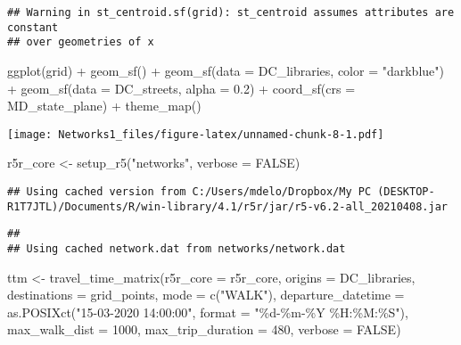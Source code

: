\documentclass[
]{article}
\newenvironment{Shaded}{\begin{snugshade}}{\end{snugshade}}
\newcommand{\AttributeTok}[1]{\textcolor[rgb]{0.77,0.63,0.00}{#1}}
\newcommand{\ConstantTok}[1]{\textcolor[rgb]{0.00,0.00,0.00}{#1}}
\newcommand{\DecValTok}[1]{\textcolor[rgb]{0.00,0.00,0.81}{#1}}
\newcommand{\FloatTok}[1]{\textcolor[rgb]{0.00,0.00,0.81}{#1}}
\newcommand{\FunctionTok}[1]{\textcolor[rgb]{0.00,0.00,0.00}{#1}}
\newcommand{\NormalTok}[1]{#1}
\newcommand{\OtherTok}[1]{\textcolor[rgb]{0.56,0.35,0.01}{#1}}
\newcommand{\SpecialCharTok}[1]{\textcolor[rgb]{0.00,0.00,0.00}{#1}}
\newcommand{\StringTok}[1]{\textcolor[rgb]{0.31,0.60,0.02}{#1}}
\begin{document}
\begin{verbatim}
## Warning in st_centroid.sf(grid): st_centroid assumes attributes are constant
## over geometries of x
\end{verbatim}

\begin{Shaded}
\begin{Highlighting}[]
\FunctionTok{ggplot}\NormalTok{(grid) }\SpecialCharTok{+}
  \FunctionTok{geom\_sf}\NormalTok{() }\SpecialCharTok{+}
  \FunctionTok{geom\_sf}\NormalTok{(}\AttributeTok{data =}\NormalTok{ DC\_libraries, }\AttributeTok{color =} \StringTok{"darkblue"}\NormalTok{) }\SpecialCharTok{+}
  \FunctionTok{geom\_sf}\NormalTok{(}\AttributeTok{data =}\NormalTok{ DC\_streets, }\AttributeTok{alpha =} \FloatTok{0.2}\NormalTok{) }\SpecialCharTok{+}
  \FunctionTok{coord\_sf}\NormalTok{(}\AttributeTok{crs =}\NormalTok{ MD\_state\_plane) }\SpecialCharTok{+} 
  \FunctionTok{theme\_map}\NormalTok{()}
\end{Highlighting}
\end{Shaded}

\texttt{[image: Networks1\_files/figure-latex/unnamed-chunk-8-1.pdf]}

\begin{Shaded}
\begin{Highlighting}[]
\NormalTok{r5r\_core }\OtherTok{\textless{}{-}} \FunctionTok{setup\_r5}\NormalTok{(}\StringTok{"networks"}\NormalTok{, }\AttributeTok{verbose =} \ConstantTok{FALSE}\NormalTok{)}
\end{Highlighting}
\end{Shaded}

\begin{verbatim}
## Using cached version from C:/Users/mdelo/Dropbox/My PC (DESKTOP-R1T7JTL)/Documents/R/win-library/4.1/r5r/jar/r5-v6.2-all_20210408.jar
\end{verbatim}

\begin{verbatim}
## 
## Using cached network.dat from networks/network.dat
\end{verbatim}

\begin{Shaded}
\begin{Highlighting}[]
\NormalTok{ttm }\OtherTok{\textless{}{-}} \FunctionTok{travel\_time\_matrix}\NormalTok{(}\AttributeTok{r5r\_core =}\NormalTok{ r5r\_core,}
                          \AttributeTok{origins =}\NormalTok{ DC\_libraries,}
                          \AttributeTok{destinations =}\NormalTok{ grid\_points,}
                          \AttributeTok{mode =} \FunctionTok{c}\NormalTok{(}\StringTok{"WALK"}\NormalTok{),}
                          \AttributeTok{departure\_datetime =} \FunctionTok{as.POSIXct}\NormalTok{(}\StringTok{"15{-}03{-}2020 14:00:00"}\NormalTok{,}
                                 \AttributeTok{format =} \StringTok{"\%d{-}\%m{-}\%Y \%H:\%M:\%S"}\NormalTok{),}
                          \AttributeTok{max\_walk\_dist =} \DecValTok{1000}\NormalTok{,}
                          \AttributeTok{max\_trip\_duration =} \DecValTok{480}\NormalTok{,}
                          \AttributeTok{verbose =} \ConstantTok{FALSE}\NormalTok{)}
\end{Highlighting}
\end{Shaded}
\end{document}
